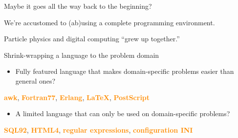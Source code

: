\documentclass[aspectratio=169]{beamer}
\begin{document}
\begin{frame}{Maybe it goes all the way back to the beginning?}
\large
\vspace{0.5 cm}

We're accustomed to (ab)using a complete programming environment.

\vspace{0.5 cm}
Particle physics and digital computing ``grew up together.''

\vspace{1 cm}
\end{frame}

\begin{frame}{Shrink-wrapping a language to the problem domain}
\large
\begin{itemize}
\item Fully featured language that makes domain-specific problems easier than general ones?
\end{itemize}

\begin{center}
\textcolor{darkorange}{\bf awk}, \textcolor{darkorange}{\bf Fortran77}, \textcolor{darkorange}{\bf Erlang}, \textcolor{darkorange}{\bf \LaTeX}, \textcolor{darkorange}{\bf PostScript}
\end{center}

\begin{itemize}
\item A limited language that can only be used on domain-specific problems?
\end{itemize}

\begin{center}
\textcolor{darkorange}{\bf SQL92}, \textcolor{darkorange}{\bf HTML4}, \textcolor{darkorange}{\bf regular expressions}, \textcolor{darkorange}{\bf configuration INI}
\end{center}
\end{frame}

\begin{frame}{}


\end{frame}
\end{document}
